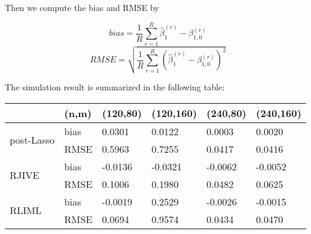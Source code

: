 \documentclass[12pt, a4paper]{article}
\begin{document}
\noindent Then we compute the bias and RMSE by

\begin{equation}
bias =\frac{1}{R}\sum\limits_{r = 1}^R\hat{\beta}_1^{(r)} - \beta_{1,0}^{(r)}
\end{equation}
\begin{equation}
RMSE = \sqrt{\frac{1}{R}\sum\limits_{r=1}^R(\hat{\beta}_1^{(r)} - \beta_{1,0}^{(r)})^2}
\end{equation}

\noindent The simulation result is summarized in the following table:\\

\begin{tabular}{ |p{1.5cm}|p{1.8cm}|p{1.8cm}|p{1.8cm}|p{1.8cm}|p{1.8cm}|  }
	\hline
	&(n,m) & (120,80) & (120,160) & (240,80) & (240,160)\\
	\hline
	\multirow{2}{0pt}{post-Lasso} & bias & 0.0301 & 0.0122 &	0.0003 & 0.0020\\
	& RMSE & 0.5963 & 0.7255 & 0.0417 & 0.0416\\
	\hline
	\multirow{2}{0pt}{RJIVE} & bias & -0.0136 & -0.0321 & -0.0062 & -0.0052\\
	& RMSE & 0.1006 & 0.1980 & 0.0482 &	0.0625\\
	\hline
	\multirow{2}{0pt}{RLIML} & bias & -0.0019 & 0.2529 & -0.0026 & -0.0015\\
	& RMSE & 0.0694 & 0.9574 & 0.0434 &	0.0470\\
	\hline
\end{tabular}

\newpage


\end{document}
